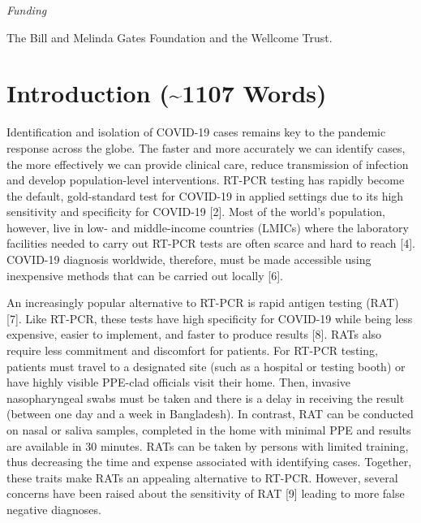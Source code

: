 \documentclass[]{elsarticle} %
\begin{document}
\emph{Funding}

The Bill and Melinda Gates Foundation and the Wellcome Trust.

\hypertarget{introduction-1107-words}{%
\section{Introduction (\textasciitilde1107 Words)}\label{introduction-1107-words}}

Identification and isolation of COVID-19 cases remains key to the pandemic response across the globe.
The faster and more accurately we can identify cases, the more effectively we can provide clinical care, reduce transmission of infection and develop population-level interventions.
RT-PCR testing has rapidly become the default, gold-standard test for COVID-19 in applied settings due to its high sensitivity and specificity for COVID-19 {[}2{]}.
Most of the world's population, however, live in low- and middle-income countries (LMICs) where the laboratory facilities needed to carry out RT-PCR tests are often scarce and hard to reach {[}4{]}.
COVID-19 diagnosis worldwide, therefore, must be made accessible using inexpensive methods that can be carried out locally {[}6{]}.

An increasingly popular alternative to RT-PCR is rapid antigen testing (RAT) {[}7{]}.
Like RT-PCR, these tests have high specificity for COVID-19 while being less expensive, easier to implement, and faster to produce results {[}8{]}.
RATs also require less commitment and discomfort for patients.
For RT-PCR testing, patients must travel to a designated site (such as a hospital or testing booth) or have highly visible PPE-clad officials visit their home.
Then, invasive nasopharyngeal swabs must be taken and there is a delay in receiving the result (between one day and a week in Bangladesh).
In contrast, RAT can be conducted on nasal or saliva samples, completed in the home with minimal PPE and results are available in 30 minutes.
RATs can be taken by persons with limited training, thus decreasing the time and expense associated with identifying cases.
Together, these traits make RATs an appealing alternative to RT-PCR.
However, several concerns have been raised about the sensitivity of RAT {[}9{]} leading to more false negative diagnoses.
\end{document}
